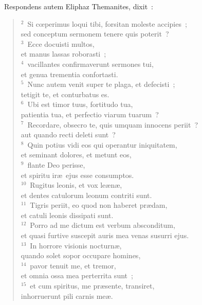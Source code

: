 ~\lettrine[lines=10,image=true,loversize=0.05,lraise=-0.03]{R}{}espondens autem Eliphaz Themanites, dixit~:
\begin{flushleft}\begin{verse}\vspace{6pt}${}^{2}$~Si cœperimus loqui tibi, forsitan moleste accipies~;\\ sed conceptum sermonem tenere quis poterit~?\\
${}^{3}$~Ecce docuisti multos,\\ et manus lassas roborasti~;\\
${}^{4}$~vacillantes confirmaverunt sermones tui,\\ et genua trementia confortasti.\\
${}^{5}$~Nunc autem venit super te plaga, et defecisti~;\\ tetigit te, et conturbatus es.\\
${}^{6}$~Ubi est timor tuus, fortitudo tua,\\ patientia tua, et perfectio viarum tuarum~?\\
${}^{7}$~Recordare, obsecro te, quis umquam innocens periit~?\\ aut quando recti deleti sunt~?\\
${}^{8}$~Quin potius vidi eos qui operantur iniquitatem,\\ et seminant dolores, et metunt eos,\\
${}^{9}$~flante Deo perisse,\\ et spiritu ir\ae\ ejus esse consumptos.\\
${}^{10}$~Rugitus leonis, et vox le\ae n\ae ,\\ et dentes catulorum leonum contriti sunt.\\
${}^{11}$~Tigris periit, eo quod non haberet pr\ae dam,\\ et catuli leonis dissipati sunt.\\
${}^{12}$~Porro ad me dictum est verbum absconditum,\\ et quasi furtive suscepit auris mea venas susurri ejus.\\
${}^{13}$~In horrore visionis nocturn\ae ,\\ quando solet sopor occupare homines,\\
${}^{14}$~pavor tenuit me, et tremor,\\ et omnia ossa mea perterrita sunt~;\\
${}^{15}$~et cum spiritus, me pr\ae sente, transiret,\\ inhorruerunt pili carnis me\ae .\\

\end{verse}
\end{flushleft}
